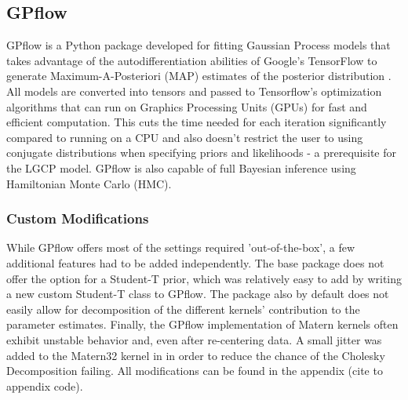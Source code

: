 \subsection{GPflow}

GPflow is a Python package developed for fitting Gaussian Process models that takes advantage of the autodifferentiation abilities of Google's TensorFlow to generate Maximum-A-Posteriori (MAP) estimates of the posterior distribution \cite{GPflow2017} \cite{tensorflow2015-whitepaper}. All models are converted into tensors and passed to Tensorflow's optimization algorithms that can run on Graphics Processing Units (GPUs) for fast and efficient computation. This cuts the time needed for each iteration significantly compared to running on a CPU and also doesn't restrict the user to using conjugate distributions when specifying priors and likelihoods - a prerequisite for the LGCP model. GPflow is also capable of full Bayesian inference using Hamiltonian Monte Carlo (HMC).

\subsubsection{Custom Modifications}

While GPflow offers most of the settings required 'out-of-the-box', a few additional features had to be added independently. The base package does not offer the option for a Student-T prior, which was relatively easy to add by writing a new custom Student-T class to GPflow. The package also by default does not easily allow for decomposition of the different kernels' contribution to the parameter estimates. Finally, the GPflow implementation of Matern kernels often exhibit unstable behavior and, even after re-centering data. A small jitter was added to the Matern32 kernel in in order to reduce the chance of the Cholesky Decomposition failing. All modifications can be found in the appendix \todo(cite to appendix code).
